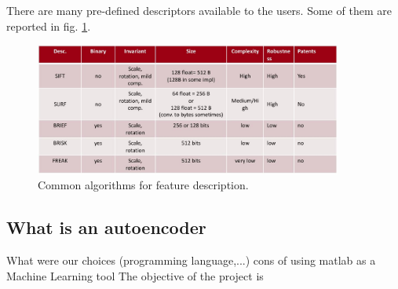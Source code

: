 There are many pre-defined descriptors available to the users. Some of them are reported in fig. \ref{fig:descriptors}.

\begin{figure}[h!]
    \centering
    \includegraphics[width=0.9\textwidth]{images/Descriptors.jpg}
    \caption{Common algorithms for feature description.}
    \label{fig:descriptors}    
\end{figure}

\subsection{What is an autoencoder}

What were our choices (programming language,...) cons of using matlab as a Machine Learning tool
The objective of the project is